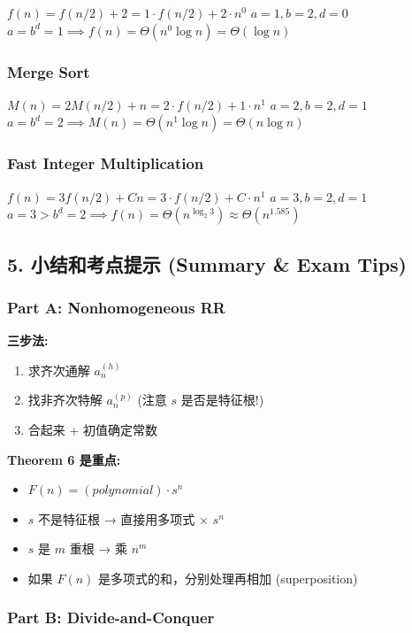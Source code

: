 \documentclass[10pt,a4paper,openany]{ctexbook}
\theoremstyle{definition}
\theoremstyle{remark}
\begin{document}
$f(n) = f(n/2) + 2 = 1 \cdot f(n/2) + 2 \cdot n^0$
$a = 1, b = 2, d = 0$
$a = b^d = 1 \implies f(n) = \Theta(n^0 \log n) = \Theta(\log n)$
\subsubsection{Merge Sort}

$M(n) = 2M(n/2) + n = 2 \cdot f(n/2) + 1 \cdot n^1$
$a = 2, b = 2, d = 1$
$a = b^d = 2 \implies M(n) = \Theta(n^1 \log n) = \Theta(n \log n)$
\subsubsection{Fast Integer Multiplication}

$f(n) = 3f(n/2) + Cn = 3 \cdot f(n/2) + C \cdot n^1$
$a = 3, b = 2, d = 1$
$a = 3 > b^d = 2 \implies f(n) = \Theta(n^{\log_2 3}) \approx \Theta(n^{1.585})$
\vspace{-2pt}

\subsection{5. 小结和考点提示 (Summary \& Exam Tips)}

\subsubsection{Part A: Nonhomogeneous RR}

\textbf{三步法:}
\begin{enumerate}
\item 求齐次通解 $a_n^{(h)}$
\item 找非齐次特解 $a_n^{(p)}$ (注意 $s$ 是否是特征根!)
\item 合起来 + 初值确定常数

\end{enumerate}

\textbf{Theorem 6 是重点:}
\begin{itemize}
\item $F(n) = (polynomial) \cdot s^n$
\item $s$ 不是特征根 → 直接用多项式 × $s^n$
\item $s$ 是 $m$ 重根 → 乘 $n^m$
\item 如果 $F(n)$ 是多项式的和，分别处理再相加 (superposition)

\end{itemize}

\subsubsection{Part B: Divide-and-Conquer}
\end{document}
